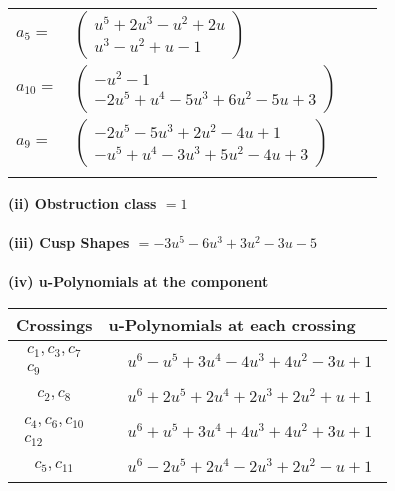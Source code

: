 \documentclass[1p]{elsarticle_modified}
\theoremstyle{definition}
\begin{document}
\begin{tabular}{m{7pt} m{180pt} m{7pt} m{180pt} }
\flushright $a_{5}=$&$\begin{pmatrix}u^5+2 u^3- u^2+2 u\\u^3- u^2+u-1\end{pmatrix}$ \\
\flushright $a_{10}=$&$\begin{pmatrix}- u^2-1\\-2 u^5+u^4-5 u^3+6 u^2-5 u+3\end{pmatrix}$ \\
\flushright $a_{9}=$&$\begin{pmatrix}-2 u^5-5 u^3+2 u^2-4 u+1\\- u^5+u^4-3 u^3+5 u^2-4 u+3\end{pmatrix}$\\&\end{tabular}
\flushleft \textbf{(ii) Obstruction class $= 1$}\\~\\
\flushleft \textbf{(iii) Cusp Shapes $= -3 u^5-6 u^3+3 u^2-3 u-5$}\\~\\
\newpage\renewcommand{\arraystretch}{1}
\flushleft \textbf{(iv) u-Polynomials at the component}\newline \\
\begin{tabular}{m{50pt}|m{274pt}}
Crossings & \hspace{64pt}u-Polynomials at each crossing \\
\hline $$\begin{aligned}c_{1},c_{3},c_{7}\\c_{9}\end{aligned}$$&$\begin{aligned}
&u^6- u^5+3 u^4-4 u^3+4 u^2-3 u+1
\end{aligned}$\\
\hline $$\begin{aligned}c_{2},c_{8}\end{aligned}$$&$\begin{aligned}
&u^6+2 u^5+2 u^4+2 u^3+2 u^2+u+1
\end{aligned}$\\
\hline $$\begin{aligned}c_{4},c_{6},c_{10}\\c_{12}\end{aligned}$$&$\begin{aligned}
&u^6+u^5+3 u^4+4 u^3+4 u^2+3 u+1
\end{aligned}$\\
\hline $$\begin{aligned}c_{5},c_{11}\end{aligned}$$&$\begin{aligned}
&u^6-2 u^5+2 u^4-2 u^3+2 u^2- u+1
\end{aligned}$\\
\hline
\end{tabular}\\~\\
\end{document}
